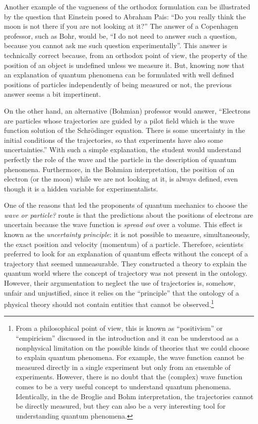 \documentclass[nofootinbib, secnumarabic, amsmath, nobibnotes,11pt,aps,pra, floatfix]{revtex4-1}
\begin{document}
Another example of the vagueness of the orthodox formulation can be illustrated by the question that Einstein posed to Abraham Pais: ``Do you really think the moon is not there if you are not looking at it?'' The answer of a Copenhagen professor, such as Bohr, would be, ``I do not need to answer such a question, because you cannot ask me such question experimentally''. This answer is technically correct because, from an orthodox point of view, the property of the position of an object is undefined unless we measure it. But, knowing now that an explanation of quantum phenomena can be formulated with well defined positions of particles independently of being measured or not, the previous answer seems a bit impertinent. 

On the other hand, an alternative (Bohmian) professor would answer,
``Electrons are particles whose trajectories are guided by a pilot
field which is  the wave function solution of the Schr\"odinger
equation. There is some uncertainty in the initial conditions of the
trajectories, so that experiments have also some uncertainties.''
With such a simple explanation, the student would understand
perfectly the role of the wave and the particle in the description
of quantum phenomena. Furthermore, in the Bohmian interpretation,
the position of an electron (or the moon) while we are not looking
at it, is always defined, even though it is a hidden variable  for experimentalists.

One of the reasons that led the proponents of quantum mechanics to
choose the \textit{wave or particle?} route is that the predictions
about the positions of electrons are uncertain because the wave
function is \textit{spread out} over a volume. This effect is known
as the \textit{uncertainty principle}: it is not possible to
measure, simultaneously, the exact position and velocity (momentum)
of a particle. Therefore, scientists preferred to look for an
explanation of quantum effects without the concept of a trajectory
that seemed unmeasurable. They constructed a theory to explain the quantum world where the concept of trajectory was not present in the ontology. However, their argumentation to neglect the use of trajectories is, somehow, unfair and
unjustified, since it relies on the ``principle'' that the ontology of a physical
theory should not contain entities that cannot be
observed.\footnote{From a philosophical point of view, this is known
as ``positivism'' or ``empiricism'' discussed in the introduction and it can be understood as a nonphysical
limitation on the possible kinds of theories that we could choose to
explain quantum phenomena. For example, the wave function cannot be
measured directly in a single experiment but only from
an ensemble of experiments. However, there is no doubt that the
(complex) wave function comes to be a very useful
concept to understand quantum phenomena. Identically, in the de
Broglie and Bohm interpretation, the trajectories cannot be directly measured, but they can also be a very interesting tool for
understanding quantum phenomena.}
\end{document}
